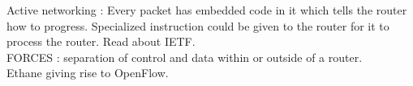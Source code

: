 \documentclass[solution,addpoints,12pt]{exam}
\begin{document}
Active networking : Every packet has embedded code
in it which tells the router how to progress. Specialized
instruction could be given to the router for it to process
the router. Read about IETF.\\

FORCES : separation of control and data within or outside of a router.\\
Ethane giving rise to OpenFlow.\\
\end{document}
